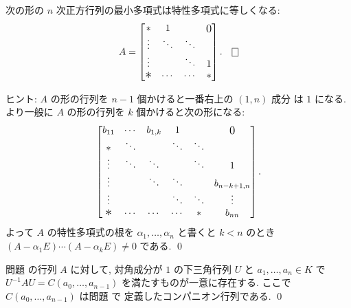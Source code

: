 \documentclass[12pt,twoside]{jarticle}
\begin{document}

\begin{question}
\label{q:minimal-polyn-11}
  次の形の $n$ 次正方行列の最小多項式は特性多項式に等しくなる:
  \begin{equation*}
    A =
    \begin{bmatrix}
      *         & 1      &        & \bigzerou \\
      \vdots    & \ddots & \ddots & \\
      \vdots    &        & \ddots & 1 \\
      \bigstarl & \cdots & \cdots & * \\
    \end{bmatrix}.
    \qed
  \end{equation*}
\end{question}

\noindent
ヒント: $A$ の形の行列を $n-1$ 個かけると一番右上の $(1,n)$ 成分
は $1$ になる.  より一般に $A$ の形の行列を $k$ 個かけると次の形になる:
\begin{equation*}
  \begin{bmatrix}
    b_{11}    & \cdots & b_{1,k} & 1      &        & \bigzerou \\
    *         & \ddots &         & \ddots & \ddots & \\
    \vdots    & \ddots & \ddots  &        & \ddots & 1 \\
    \vdots    &        & \ddots  & \ddots &        & b_{n-k+1,n} \\
    \vdots    &        &         & \ddots & \ddots & \vdots \\
    \bigstarl & \cdots & \cdots  & \cdots & *      & b_{nn} \\
  \end{bmatrix}.
\end{equation*}
よって $A$ の特性多項式の根を $\alpha_1,\dots,\alpha_n$ 
と書くと $k<n$ のとき $(A-\alpha_1E)\cdots(A-\alpha_kE)\ne 0$ である.
\qed


\begin{question}
\label{q:minimal-polyn-12}
  問題  の行列 $A$ に対して,
  対角成分が $1$ の下三角行列 $U$ と $a_1,\dots,a_n\in K$ 
  で $U^{-1}AU = C(a_0,\dots,a_{n-1})$ を満たすものが一意に存在する.
  ここで $C(a_0,\dots,a_{n-1})$ は問題  で
  定義したコンパニオン行列である. 
  \qed
\end{question}
\end{document}
